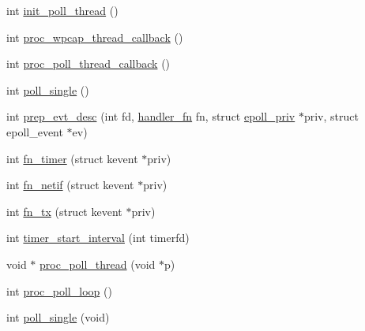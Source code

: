 \begin{DoxyCompactItemize}
int \hyperlink{classavdecc__lib_1_1system__layer2__multithreaded__callback_aa35a97c34b41216dbbecc77a76595918}{init\+\_\+poll\+\_\+thread} ()
\item 
int \hyperlink{classavdecc__lib_1_1system__layer2__multithreaded__callback_a54a695e290c1dcaabec7be12625b3b81}{proc\+\_\+wpcap\+\_\+thread\+\_\+callback} ()
\item 
int \hyperlink{classavdecc__lib_1_1system__layer2__multithreaded__callback_aa3e8732e32ef9126093c67a1cc0d59f3}{proc\+\_\+poll\+\_\+thread\+\_\+callback} ()
\item 
int \hyperlink{classavdecc__lib_1_1system__layer2__multithreaded__callback_ab68e4153b13ef0665ef6cacbf5e625b4}{poll\+\_\+single} ()
\item 
int \hyperlink{classavdecc__lib_1_1system__layer2__multithreaded__callback_ad45575cb73c470467150d44e2051ceb6}{prep\+\_\+evt\+\_\+desc} (int fd, \hyperlink{classavdecc__lib_1_1system__layer2__multithreaded__callback_aead26f50f9ac63097d31fcf8235ad693}{handler\+\_\+fn} fn, struct \hyperlink{structavdecc__lib_1_1system__layer2__multithreaded__callback_1_1epoll__priv}{epoll\+\_\+priv} $\ast$priv, struct epoll\+\_\+event $\ast$ev)
\item 
int \hyperlink{classavdecc__lib_1_1system__layer2__multithreaded__callback_a099aed51a4bdaa9da3a2039b88aae676}{fn\+\_\+timer} (struct kevent $\ast$priv)
\item 
int \hyperlink{classavdecc__lib_1_1system__layer2__multithreaded__callback_a9970e4469c716b1b2eee9e5d05b748ed}{fn\+\_\+netif} (struct kevent $\ast$priv)
\item 
int \hyperlink{classavdecc__lib_1_1system__layer2__multithreaded__callback_a50d6e1886f48aa9ee9bb9b2f2d893910}{fn\+\_\+tx} (struct kevent $\ast$priv)
\item 
int \hyperlink{classavdecc__lib_1_1system__layer2__multithreaded__callback_ae921ed6f4870489118b852f37e353a1e}{timer\+\_\+start\+\_\+interval} (int timerfd)
\item 
void $\ast$ \hyperlink{classavdecc__lib_1_1system__layer2__multithreaded__callback_a566d3a80483ff476552c0ae2fd319448}{proc\+\_\+poll\+\_\+thread} (void $\ast$p)
\item 
int \hyperlink{classavdecc__lib_1_1system__layer2__multithreaded__callback_a09e472b0088f22960c0441c5245097b8}{proc\+\_\+poll\+\_\+loop} ()
\item 
int \hyperlink{classavdecc__lib_1_1system__layer2__multithreaded__callback_aeec60d44f88ac359719331fd77ee3d14}{poll\+\_\+single} (void)
\end{DoxyCompactItemize}
